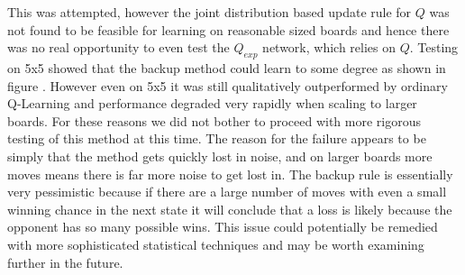 \documentclass{article}
\begin{document}
This was attempted, however the joint distribution based update rule for $Q$ was not found to be feasible for learning on reasonable sized boards and hence there was no real opportunity to even test the $Q_{exp}$ network, which relies on $Q$.  Testing on 5x5 showed that the backup method could learn to some degree as shown in figure \cite{5x5}. However even on 5x5 it was still qualitatively outperformed by ordinary Q-Learning and performance degraded very rapidly when scaling to larger boards. For these reasons we did not bother to proceed with more rigorous testing of this method at this time. The reason for the failure appears to be simply that the method gets quickly lost in noise, and on larger boards more moves means there is far more noise to get lost in. The backup rule is essentially very pessimistic because if there are a large number of moves with even a small winning chance in the next state it will conclude that a loss is likely because the opponent has so many possible wins. This issue could potentially be remedied with more sophisticated statistical techniques and may be worth examining further in the future.
\end{document}
